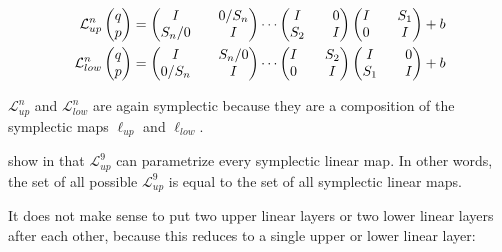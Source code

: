 \documentclass[twoside,a4paper]{article}
\begin{document}
\begin{align*}
	\mathcal{L}^{n}_{up} \begin{pmatrix} q \\ p \end{pmatrix} &= \begin{pmatrix}
		I && 0 / S_n \\
		S_n / 0 && I
	\end{pmatrix}
	\cdots
	\begin{pmatrix}
		I && 0 \\
		S_2 && I
	\end{pmatrix}
	\begin{pmatrix}
		I && S_1 \\
		0 && I
	\end{pmatrix} + b \\
	\mathcal{L}^{n}_{low} \begin{pmatrix} q \\ p \end{pmatrix} &= \begin{pmatrix}
		I && S_n / 0 \\
		0 / S_n && I
	\end{pmatrix}
	\cdots
	\begin{pmatrix}
		I && S_2 \\
		0 && I
	\end{pmatrix}
	\begin{pmatrix}
		I && 0 \\
		S_1 && I
	\end{pmatrix} + b
\end{align*}

$\mathcal{L}^{n}_{up}$ and $\mathcal{L}^{n}_{low}$ are again symplectic because they 
are a composition of the symplectic maps $\ell_{up}$ and $\ell_{low}$.

\citeauthor{jin2020unit} show in \cite{jin2020unit} that $\mathcal{L}^{9}_{up}$
can parametrize every symplectic linear map. In other words, 
the set of all possible $\mathcal{L}^{9}_{up}$ is equal to the set of all symplectic linear maps.

It does not make sense to put two upper linear layers or two lower linear layers after each other,
because this reduces to a single upper or lower linear layer:
\end{document}

